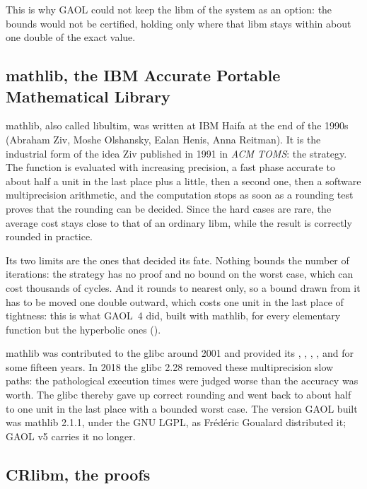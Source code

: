 \medskip
This is why GAOL could not keep the libm of the system as an option: the
bounds would not be certified, holding only where that libm stays within
about one double of the exact value.

\subsection{mathlib, the IBM Accurate Portable Mathematical Library}

mathlib, also called libultim, was written at IBM Haifa at the end of the
1990s (Abraham Ziv, Moshe Olshansky, Ealan Henis, Anna Reitman). It is the
industrial form of the idea Ziv published in 1991 in \emph{ACM TOMS}: the
 strategy. The function is evaluated with increasing
precision, a fast phase accurate to about half a unit in the last place
plus a little, then a second one, then a software multiprecision
arithmetic, and the computation stops as soon as a rounding test proves
that the rounding can be decided. Since the hard cases are rare, the
average cost stays close to that of an ordinary libm, while the result is
correctly rounded in practice.

\medskip
Its two limits are the ones that decided its fate. Nothing bounds the
number of iterations: the strategy has no proof and no bound on the worst
case, which can cost thousands of cycles. And it rounds to nearest only, so
a bound drawn from it has to be moved one double outward, which costs one
unit in the last place of tightness: this is what GAOL~4 did, built with
mathlib, for every elementary function but the hyperbolic ones
().

\medskip
mathlib was contributed to the glibc around 2001 and provided its
, , , ,  and 
for some fifteen years. In 2018 the glibc 2.28 removed these
multiprecision slow paths: the pathological execution times were judged
worse than the accuracy was worth. The glibc thereby gave up correct
rounding and went back to about half to one unit in the last place with a
bounded worst case. The version GAOL built was mathlib 2.1.1, under the GNU
LGPL, as Fr\'ed\'eric Goualard distributed it; GAOL v5 carries it no
longer.\newinvfive

\subsection{CRlibm, the proofs}

